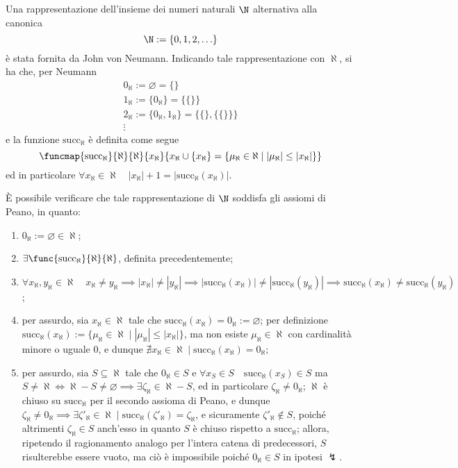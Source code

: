 \documentclass[a4paper, 12pt]{report}
\begin{document}
    \begin{example}
        Una rappresentazione dell'insieme dei numeri naturali $\N$ alternativa alla canonica $$\N := \{0, 1, 2, \ldots \}$$ è stata fornita da John von Neumann. Indicando tale rappresentazione con $\aleph$, si ha che, per Neumann $$\begin{array}{c} 0_\aleph := \varnothing  = \{\} \\ 1_\aleph := \{ 0_\aleph \} = \{ \{ \}\} \\ 2_\aleph := \{0_\aleph, 1_\aleph\} = \{\{\}, \{\{ \}\}\} \\ \vdots \end{array}$$ e la funzione $\mathrm{succ}_\aleph$ è definita come segue $$\funcmap{\mathrm{succ}_\aleph}{\aleph}{\aleph}{x_\aleph}{x_\aleph \cup \{x_\aleph\} = \{\mu_\aleph \in \aleph \mid |\mu_\aleph| \le |x_\aleph|\}}$$ ed in particolare $\forall x_\aleph \in \aleph \quad |x_\aleph| + 1 = |\mathrm{succ}_\aleph(x_\aleph)|$.

        È possibile verificare che tale rappresentazione di $\N$ soddisfa gli assiomi di Peano, in quanto:

        \begin{enumerate}[label=\roman*), font=\itshape]
            \item $0_\aleph := \varnothing \in \aleph$;
            \item $\exists \func{\mathrm{succ}_\aleph}{\aleph}{\aleph}$, definita precedentemente;
            \item $\forall x_\aleph, y_\aleph \in \aleph \quad x_\aleph \neq y_\aleph \implies |x_\aleph| \neq |y_\aleph| \implies  |\mathrm{succ}_\aleph(x_\aleph)| \neq |\mathrm{succ}_\aleph(y_\aleph)| \implies \mathrm{succ}_\aleph(x_\aleph) \neq \mathrm{succ}_\aleph(y_\aleph)$;
            \item per assurdo, sia $x_\aleph \in \aleph$ tale che $\mathrm{succ}_\aleph(x_\aleph) = 0_\aleph := \varnothing$; per definizione $\mathrm{succ}_\aleph(x_\aleph) := \{\mu_\aleph \in \aleph \mid |\mu_\aleph| \le |x_\aleph|\}$, ma non esiste $\mu_\aleph \in \aleph$ con cardinalità minore o uguale 0, e dunque $\nexists x_\aleph \in \aleph \mid \mathrm{succ}_\aleph(x_\aleph) = 0_\aleph$;
            \item per assurdo, sia $S \subseteq \aleph$ tale che $0_\aleph \in S$ e $\forall x_S \in S \quad \mathrm{succ}_\aleph(x_S) \in S$ ma $S \neq \aleph \iff \aleph - S \neq \varnothing \implies \exists \zeta_\aleph \in \aleph - S$, ed in particolare $\zeta_\aleph \neq 0_\aleph$; $\aleph$ è chiuso su $\mathrm{succ}_\aleph$ per il secondo assioma di Peano, e dunque $\zeta_\aleph \neq 0_\aleph \implies \exists \zeta'_\aleph \in \aleph \mid \mathrm{succ}_\aleph(\zeta'_\aleph) = \zeta_\aleph$, e sicuramente $\zeta'_\aleph \notin S$, poiché altrimenti $\zeta_\aleph \in S$ anch'esso in quanto $S$ è chiuso rispetto a $\mathrm{succ}_\aleph$; allora, ripetendo il ragionamento analogo per l'intera catena di predecessori, $S$ risulterebbe essere vuoto, ma ciò è impossibile poiché $0_\aleph \in S$ in ipotesi $\lightning$.
        \end{enumerate}
    \end{example}
\end{document}
